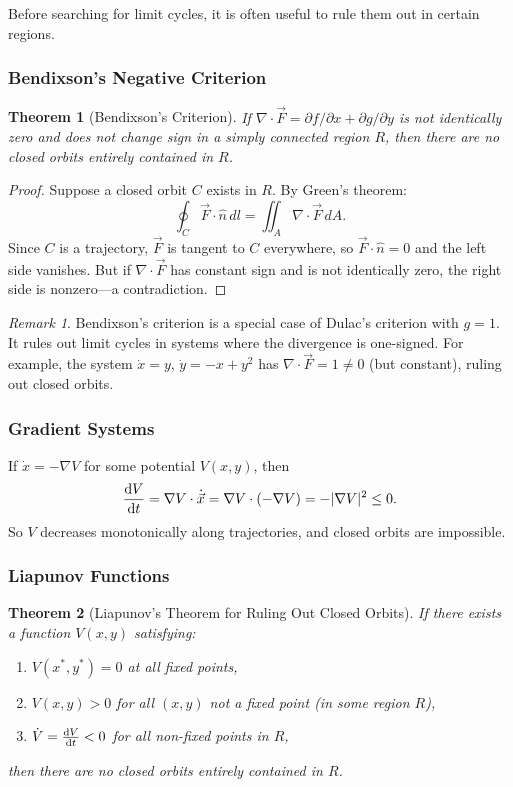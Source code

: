 \documentclass[11pt,letterpaper]{article}
\theoremstyle{definition}
\theoremstyle{plain}
\newtheorem{theorem}{Theorem}[section]
\theoremstyle{remark}
\newtheorem{remark}{Remark}[section]
\newcommand{\xstar}{x^*}
\begin{document}
Before searching for limit cycles, it is often useful to rule them out in
certain regions.

\subsubsection{Bendixson's Negative Criterion}

\begin{theorem}[Bendixson's Criterion]\label{thm:bendixson}
If $\nabla\cdot\vec{F} = \partial f/\partial x + \partial g/\partial y$
is not identically zero and does not change sign in a simply connected
region $R$, then there are no closed orbits entirely contained in $R$.
\end{theorem}
\begin{proof}
Suppose a closed orbit $C$ exists in $R$.  By Green's theorem:
\[
  \oint_C \vec{F}\cdot\hat{n}\,dl = \iint_A \nabla\cdot\vec{F}\,dA.
\]
Since $C$ is a trajectory, $\vec{F}$ is tangent to $C$ everywhere, so
$\vec{F}\cdot\hat{n}=0$ and the left side vanishes.  But if
$\nabla\cdot\vec{F}$ has constant sign and is not identically zero, the
right side is nonzero---a contradiction.
\end{proof}

\begin{remark}
Bendixson's criterion is a special case of Dulac's criterion with $g=1$.
It rules out limit cycles in systems where the divergence is one-signed.
For example, the system $\dot{x}=y$, $\dot{y}=-x+y^2$ has
$\nabla\cdot\vec{F} = 1 \neq 0$ (but constant), ruling out closed orbits.
\end{remark}

\subsubsection{Gradient Systems}

If $\dot{x} = -\nabla V$ for some potential $V(x,y)$, then
\[
  \dv{V}{t} = \nabla V \cdot \dot{\vec{x}}
  = \nabla V \cdot (-\nabla V) = -|\nabla V|^2 \le 0.
\]
So $V$ decreases monotonically along trajectories, and closed orbits are
impossible.

\subsubsection{Liapunov Functions}

\begin{theorem}[Liapunov's Theorem for Ruling Out Closed Orbits]
If there exists a function $V(x,y)$ satisfying:
\begin{enumerate}[leftmargin=2em]
\item $V(\xstar,y^*)=0$ at all fixed points,
\item $V(x,y)>0$ for all $(x,y)$ not a fixed point (in some region $R$),
\item $\dot{V} = \dv{V}{t} < 0$ for all non-fixed points in $R$,
\end{enumerate}
then there are no closed orbits entirely contained in $R$.
\end{theorem}
\end{document}
